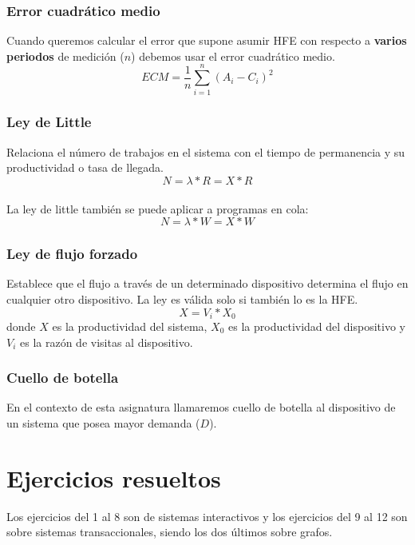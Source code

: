 \subsubsection{Error cuadrático medio}
    Cuando queremos calcular el error que supone asumir HFE con respecto a \textbf{varios periodos} de medición ($n$) debemos usar el error cuadrático medio. \[ECM = \frac{1}{n}\sum_{i=1}^{n}(A_i - C_i)^2 \]
\subsubsection{Ley de Little}
    Relaciona el número de trabajos en el sistema con el tiempo de permanencia y su productividad o tasa de llegada.\\
    \[N = \lambda * R = X*R\]\\
    La ley de little también se puede aplicar a programas en cola:\\
    \[N = \lambda * W = X*W\]
\subsubsection{Ley de flujo forzado}
   Establece que el flujo a través de un determinado dispositivo determina el flujo en cualquier otro dispositivo. La ley es válida solo si también lo es la HFE.
   \[X = V_i * X_0\]
   donde $X$ es la productividad del sistema, $X_0$ es la productividad del dispositivo y $V_i$ es la razón de visitas al dispositivo.
   
\subsubsection{Cuello de botella}
    En el contexto de esta asignatura llamaremos cuello de botella al dispositivo de un sistema que posea mayor demanda ($D$).
\newpage
\section{Ejercicios resueltos}
Los ejercicios del 1 al 8 son de sistemas interactivos y los ejercicios del 9 al 12 son sobre sistemas transaccionales, siendo los dos últimos sobre grafos.

